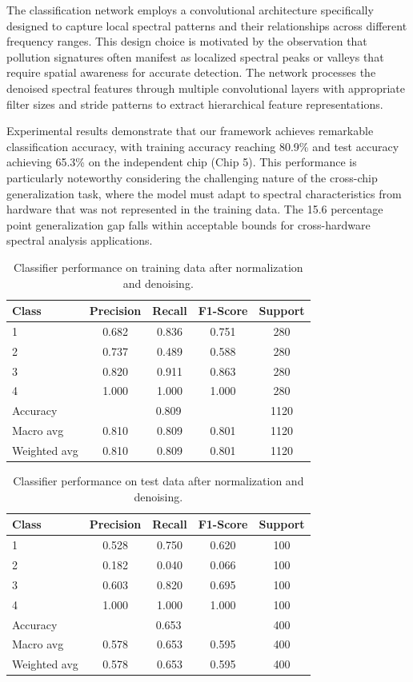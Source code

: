 The classification network employs a convolutional architecture specifically designed to capture local spectral patterns and their relationships across different frequency ranges. This design choice is motivated by the observation that pollution signatures often manifest as localized spectral peaks or valleys that require spatial awareness for accurate detection. The network processes the denoised spectral features through multiple convolutional layers with appropriate filter sizes and stride patterns to extract hierarchical feature representations.

Experimental results demonstrate that our framework achieves remarkable classification accuracy, with training accuracy reaching 80.9\% and test accuracy achieving 65.3\% on the independent chip (Chip 5). This performance is particularly noteworthy considering the challenging nature of the cross-chip generalization task, where the model must adapt to spectral characteristics from hardware that was not represented in the training data. The 15.6 percentage point generalization gap falls within acceptable bounds for cross-hardware spectral analysis applications.

\begin{table}[H]
\centering
\caption{Classifier performance on training data after normalization and denoising.}
\label{tab:classifier_train}
\begin{tabular}{l|cccc}
\toprule
Class & Precision & Recall & F1-Score & Support \\
\midrule
1 & 0.682 & 0.836 & 0.751 & 280 \\
2 & 0.737 & 0.489 & 0.588 & 280 \\
3 & 0.820 & 0.911 & 0.863 & 280 \\
4 & 1.000 & 1.000 & 1.000 & 280 \\
\midrule
Accuracy & \multicolumn{3}{c}{0.809} & 1120 \\
Macro avg & 0.810 & 0.809 & 0.801 & 1120 \\
Weighted avg & 0.810 & 0.809 & 0.801 & 1120 \\
\bottomrule
\end{tabular}
\end{table}

\begin{table}[H]
\centering
\caption{Classifier performance on test data after normalization and denoising.}
\label{tab:classifier_test}
\begin{tabular}{l|cccc}
\toprule
Class & Precision & Recall & F1-Score & Support \\
\midrule
1 & 0.528 & 0.750 & 0.620 & 100 \\
2 & 0.182 & 0.040 & 0.066 & 100 \\
3 & 0.603 & 0.820 & 0.695 & 100 \\
4 & 1.000 & 1.000 & 1.000 & 100 \\
\midrule
Accuracy & \multicolumn{3}{c}{0.653} & 400 \\
Macro avg & 0.578 & 0.653 & 0.595 & 400 \\
Weighted avg & 0.578 & 0.653 & 0.595 & 400 \\
\bottomrule
\end{tabular}
\end{table}

